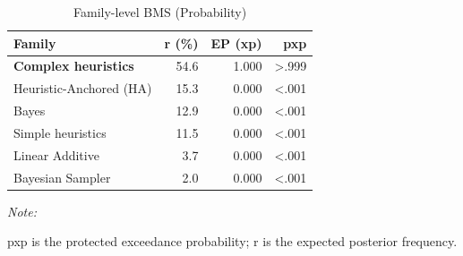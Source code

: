 \begin{table}[!h]
\centering
\caption{Family-level BMS (Probability)}
\centering
\begin{threeparttable}
\begin{tabular}[t]{lrrr}
\toprule
Family & r (\%) & EP (xp) & pxp\\
\midrule
\textbf{Complex heuristics} & 54.6 & 1.000 & >.999\\
Heuristic-Anchored (HA) & 15.3 & 0.000 & <.001\\
Bayes & 12.9 & 0.000 & <.001\\
Simple heuristics & 11.5 & 0.000 & <.001\\
Linear Additive & 3.7 & 0.000 & <.001\\
Bayesian Sampler & 2.0 & 0.000 & <.001\\
\bottomrule
\end{tabular}
\begin{tablenotes}
\item \textit{Note: } 
\item pxp is the protected exceedance probability; r is the expected posterior frequency.
\end{tablenotes}
\end{threeparttable}
\end{table}

